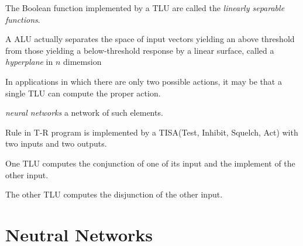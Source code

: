 The Boolean function implemented by a TLU are called the \emph{linearly separable functions}. 

A ALU actually separates the space of input vectors yielding an above threshold from those yielding a below-threshold response by a linear surface, called a \emph{hyperplane} in $n$ dimemsion

In applications in which there are only two possible actions, it may be that a single TLU can compute the proper action.

\emph{neural networks} a network of such elements.

Rule in T-R program is implemented by a TISA(Test, Inhibit, Squelch, Act) with two inputs and two outputs.

One TLU computes the conjunction of one of its input and the implement of the other input.

The other TLU computes the disjunction of the other input.

\chapter{Neutral Networks}



